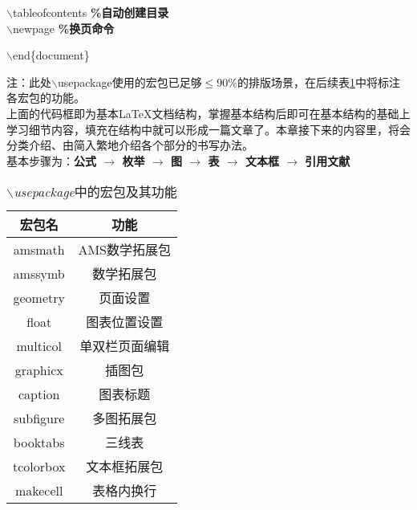 \documentclass[11pt]{article}
\let\Oldlatex\LaTeX
\renewcommand{\LaTeX}{\textrm{\Oldlatex}}
\begin{document}
\begin{center}
{\begin{minipage}{14.6cm}
    			$\backslash$tableofcontents \textbf{\%自动创建目录}\\
    			$\backslash$newpage \textbf{\%换页命令} \\
    			
    			$\backslash$end\{document\} 
    	\end{minipage}}
    \end{center}
    {\small *注：此处$\backslash$usepackage使用的宏包已足够$\le$90\%的排版场景，在后续表\ref{table3}中将标注各宏包的功能。} \\
    上面的代码框即为基本\LaTeX 文档结构，掌握基本结构后即可在基本结构的基础上学习细节内容，填充在结构中就可以形成一篇文章了。本章接下来的内容里，将会分类介绍、由简入繁地介绍各个部分的书写办法。 \\
    基本步骤为：\textbf{公式 $\to$ 枚举 $\to$ 图 $\to$ 表 $\to$ 文本框 $\to$ 引用文献} 
    \begin{table}[H]
    	\centering
    	\caption{\textit{$\backslash$usepackage}中的宏包及其功能}
    	\setlength{\tabcolsep}{50pt}
    	\begin{tabular}{c|c}
    		\toprule
    		\textbf{宏包名} & \textbf{功能} \\
    		\midrule
    		amsmath & AMS数学拓展包 \\
    		amssymb & 数学拓展包 \\
    		\midrule
    		geometry & 页面设置 \\
    		float & 图表位置设置 \\
    		multicol & 单双栏页面编辑 \\
    		\midrule
    		graphicx & 插图包 \\
    		caption & 图表标题 \\
    		subfigure & 多图拓展包 \\
    		booktabs & 三线表 \\
    		tcolorbox & 文本框拓展包 \\
    		makecell & 表格内换行 \\
    		\bottomrule
    	\end{tabular}
    	\label{table3}
    \end{table}
    
\end{document}
